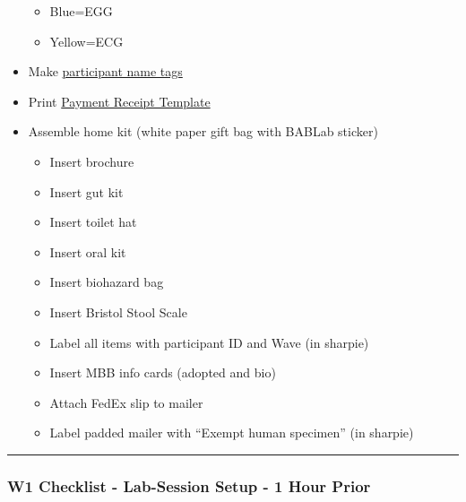 \documentclass[]{book}
\providecommand{\tightlist}{%
  \setlength{\itemsep}{0pt}\setlength{\parskip}{0pt}}
\begin{document}
\begin{itemize}
  \begin{itemize}
  \tightlist
  \item
    Blue=EGG
  \item
    Yellow=ECG
  \end{itemize}
\item
  Make \href{https://app.box.com/file/630320259767}{participant name tags}
\item
  Print \href{https://app.box.com/file/630326568873}{Payment Receipt Template}
\item
  Assemble home kit (white paper gift bag with BABLab sticker)

  \begin{itemize}
  \tightlist
  \item
    Insert brochure
  \item
    Insert gut kit
  \item
    Insert toilet hat
  \item
    Insert oral kit
  \item
    Insert biohazard bag
  \item
    Insert Bristol Stool Scale
  \item
    Label all items with participant ID and Wave (in sharpie)
  \item
    Insert MBB info cards (adopted and bio)
  \item
    Attach FedEx slip to mailer
  \item
    Label padded mailer with ``Exempt human specimen'' (in sharpie)
  \end{itemize}
\end{itemize}

\begin{center}\rule{0.5\linewidth}{0.5pt}\end{center}

\hypertarget{w1-checklist---lab-session-setup---1-hour-prior}{%
\subsubsection{W1 Checklist - Lab-Session Setup - 1 Hour Prior}\label{w1-checklist---lab-session-setup---1-hour-prior}}
\end{document}
